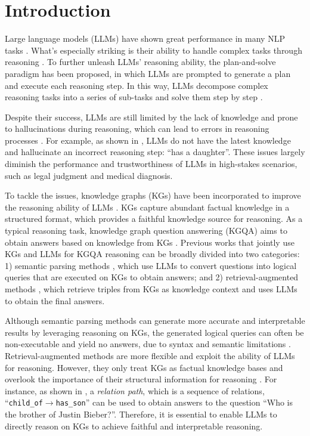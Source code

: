 \section{Introduction}
Large language models (LLMs) have shown great performance in many NLP tasks \citep{brown2020language,bang2023multitask}. What's especially striking is their ability to handle complex tasks through reasoning \citep{wei2022chain,huang2022towards}. To further unleash LLMs' reasoning ability, the plan-and-solve paradigm \citep{wang2023plan} has been proposed, in which LLMs are prompted to generate a plan and execute each reasoning step. In this way, LLMs decompose complex reasoning tasks into a series of sub-tasks and solve them step by step \citep{khot2022decomposed}. 

Despite their success, LLMs are still limited by the lack of knowledge and prone to hallucinations during reasoning, which can lead to errors in reasoning processes \citep{hong2023faithful,wang2023knowledge}. For example, as shown in , LLMs do not have the latest knowledge and hallucinate an incorrect reasoning step: ``has a daughter''. These issues largely diminish the performance and trustworthiness of LLMs in high-stakes scenarios, such as legal judgment and medical diagnosis. 

To tackle the issues, knowledge graphs (KGs) have been incorporated to improve the reasoning ability of LLMs \citep{pan2023unifying,luo2023chatrule}. KGs capture abundant factual knowledge in a structured format, which provides a faithful knowledge source for reasoning. As a typical reasoning task, knowledge graph question answering (KGQA) aims to obtain answers based on knowledge from KGs \citep{sun2019pullnet}. Previous works that jointly use KGs and LLMs for KGQA reasoning can be broadly divided into two categories: 1) semantic parsing methods \citep{lan2020query,ye2022rng}, which use LLMs to convert questions into logical queries that are executed on KGs to obtain answers; and 2) retrieval-augmented methods \citep{li2023graph,jiang2023reasoninglm}, which retrieve triples from KGs as knowledge context and uses LLMs to obtain the final answers. 

Although semantic parsing methods can generate more accurate and interpretable results by leveraging reasoning on KGs, the generated logical queries can often be non-executable and yield no answers, due to syntax and semantic limitations \citep{yu2022decaf}. Retrieval-augmented methods are more flexible and exploit the ability of LLMs for reasoning. However, they only treat KGs as factual knowledge bases and overlook the importance of their structural information for reasoning \citep{jiang2022unikgqa}. For instance, as shown in , a \emph{relation path}, which is a sequence of relations, ``\texttt{child\_of}$\to$\texttt{has\_son}'' can be used to obtain answers to the question ``Who is the brother of Justin Bieber?''.  Therefore, it is essential to enable LLMs to directly reason on KGs to achieve faithful and interpretable reasoning.

